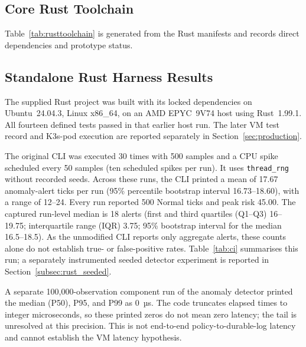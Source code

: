 \documentclass{ieeeaccess}
\begin{document}
\subsection{Core Rust Toolchain}
\label{subsec:rusttoolchain}

Table~\ref{tab:rusttoolchain} is generated from the Rust manifests and records direct dependencies and prototype status.

\begin{table}[ht]
\caption{Rust Crates Used in the Current LDPAD Harness}
\label{tab:rusttoolchain}
\centering
\setlength{\tabcolsep}{2pt}

\end{table}

\subsection{Standalone Rust Harness Results}
\label{subsec:measured}

The supplied Rust project was built with its locked dependencies on Ubuntu~24.04.3, Linux x86\_64, on an AMD EPYC~9V74 host using Rust~1.99.1. All fourteen defined tests passed in that earlier host run. The later VM test record and K3s-pod execution are reported separately in Section~\ref{sec:production}.

The original CLI was executed 30 times with 500 samples and a CPU spike scheduled every 50 samples (ten scheduled spikes per run). It uses \texttt{thread\_rng} without recorded seeds. Across these runs, the CLI printed a mean of 17.67 anomaly-alert ticks per run (95\% percentile bootstrap interval 16.73--18.60), with a range of 12--24. Every run reported 500 Normal ticks and peak risk 45.00. The captured run-level median is 18 alerts (first and third quartiles (Q1--Q3) 16--19.75; interquartile range (IQR) 3.75; 95\% bootstrap interval for the median 16.5--18.5). As the unmodified CLI reports only aggregate alerts, these counts alone do not establish true- or false-positive rates. Table~\ref{tab:ci} summarises this run; a separately instrumented seeded detector experiment is reported in Section~\ref{subsec:rust_seeded}.

\begin{table}[ht]
\caption{Unseeded Rust CLI on x86\_64: 30 runs of 500 ticks each}
\label{tab:ci}
\centering
\footnotesize
\setlength{\tabcolsep}{3pt}

\end{table}

A separate 100,000-observation component run of the anomaly detector printed the median (P50), P95, and P99 as 0~µs. The code truncates elapsed times to integer microseconds, so these printed zeros do not mean zero latency; the tail is unresolved at this precision. This is not end-to-end policy-to-durable-log latency and cannot establish the VM latency hypothesis.
\end{document}
